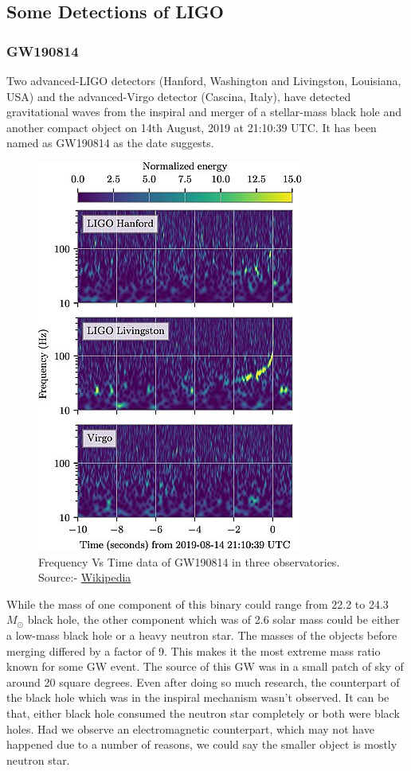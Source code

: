 \subsection{Some Detections of LIGO}

\subsubsection{GW190814}

Two advanced-LIGO detectors (Hanford, Washington and Livingston, Louisiana, USA) and the advanced-Virgo detector (Cascina, Italy), have detected gravitational waves from the inspiral and merger of a stellar-mass black hole and another compact object on 14th August, 2019 at 21:10:39 UTC. It has been named as GW190814 as the date suggests.

\begin{figure}[h]
    \centering
    \includegraphics[scale = 0.91]{images.tex/GW190814.jpg}
    \caption{Frequency Vs Time data of GW190814 in three observatories. Source:- \href{https://en.wikipedia.org/wiki/GW190814}{Wikipedia}}
\end{figure}

While the mass of one component of this binary could range from 22.2 to 24.3 $M_\odot$ black hole, the other component which was of 2.6 solar mass could be either a low-mass black hole or a heavy neutron star. The masses of the objects before merging differed by a factor of 9. This makes it the most extreme mass ratio known for some GW event. The source of this GW was in a small patch of sky of around 20 square degrees. Even after doing so much research, the counterpart of the black hole which was in the inspiral mechanism wasn’t observed. It can be that, either black hole consumed the neutron star completely or both were black holes. Had we observe an electromagnetic counterpart, which may not have happened due to a number of reasons, we could say the smaller object is mostly neutron star. 

